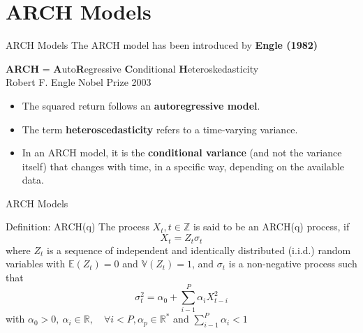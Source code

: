 \documentclass{beamer}
\def\Z{\mathbb{Z}}
\def\R{\mathbb{R}}
\def\Esp{\mathbb{E}}
\def\Var{\mathbb{V}}
\newcommand{\imfbold}[1]{\textbf{\textcolor{imfblue}{#1}}}
\begin{document}
\section{ARCH Models}
\begin{frame}{ARCH Models}
The ARCH model has been introduced by \imfbold{ Engle (1982)}
\begin{center}
    \textbf{\color{red}ARCH} = \textbf{\color{red}A}uto\textbf{\color{red}R}egressive \textbf{\color{red}C}onditional \textbf{\color{red}H}eteroskedasticity\\
    Robert F. Engle Nobel Prize 2003
\end{center}
\pause
\medskip
\begin{itemize}
    \item The squared return follows an \imfbold{autoregressive model}.
    \item The term \imfbold{ heteroscedasticity} refers to a time-varying variance.
    \item In an ARCH model, it is the \imfbold{conditional variance} (and not the variance itself) that changes with time, in a specific way, depending on the available data.    
\end{itemize}   
\end{frame}

\begin{frame}{ARCH Models}
    \begin{block}{Definition: ARCH(q)}
       The process {$X_t, t\in \Z$} is said to be an ARCH(q) process, if 
       $$X_t = Z_t\sigma_t$$
       where $Z_t$ is a sequence of independent and identically distributed (i.i.d.) random variables with $\Esp(Z_t) = 0$ and $\Var(Z_t) = 1$,
       and $\sigma_t$ is a non-negative process such that
       $$\sigma_t^2 = \alpha_0 + \sum_{i-1}^P {\alpha_{i}X_{t-i}^2}$$
       with $\alpha_0>0,~ \alpha_i \in \R, \quad \forall i<P, \alpha_p\in \R^*$ and $ \sum_{i-1}^P {\alpha_{i}} <1$ 
    \end{block}
\end{frame}

\end{document}
